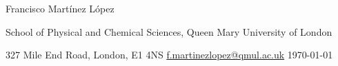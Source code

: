 \vspace*{-0.10em}
\begin{Large} 
	Francisco Mart\'inez L\'opez
\end{Large}

\vspace*{0.50em}
\begin{footnotesize}
    \begin{scshape}
		  {School of Physical and Chemical Sciences, Queen Mary University of London\linebreak}
    \end{scshape}
    {327 Mile End Road, London, E1 4NS\linebreak}
    {\href{mailto:f.martinezlopez@qmul.ac.uk}{f.martinezlopez@qmul.ac.uk} \linebreak}
    {\today}
\end{footnotesize}
\vspace*{0.4cm}